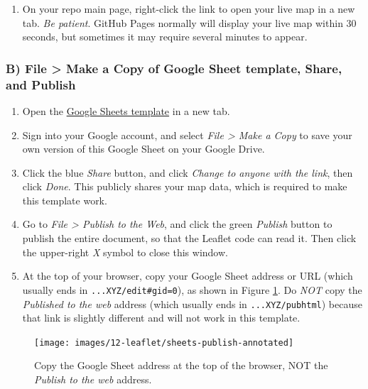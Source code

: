 \documentclass[
  english,
]{book}
\providecommand{\tightlist}{%
  \setlength{\itemsep}{0pt}\setlength{\parskip}{0pt}}
\begin{document}
\begin{enumerate}
\def\labelenumi{\arabic{enumi}.}
\setcounter{enumi}{8}
\tightlist
\item
  On your repo main page, right-click the link to open your live map in a new tab. \emph{Be patient}. GitHub Pages normally will display your live map within 30 seconds, but sometimes it may require several minutes to appear.
\end{enumerate}

\hypertarget{b-file-make-a-copy-of-google-sheet-template-share-and-publish-1}{%
\subsubsection*{B) File \textgreater{} Make a Copy of Google Sheet template, Share, and Publish}\label{b-file-make-a-copy-of-google-sheet-template-share-and-publish-1}}

\begin{enumerate}
\def\labelenumi{\arabic{enumi}.}
\item
  Open the \href{13-}{Google Sheets template} in a new tab.
\item
  Sign into your Google account, and select \emph{File \textgreater{} Make a Copy} to save your own version of this Google Sheet on your Google Drive.
\item
  Click the blue \emph{Share} button, and click \emph{Change to anyone with the link}, then click \emph{Done}. This publicly shares your map data, which is required to make this template work.
\item
  Go to \emph{File \textgreater{} Publish to the Web}, and click the green \emph{Publish} button to publish the entire document, so that the Leaflet code can read it. Then click the upper-right \emph{X} symbol to close this window.
\item
  At the top of your browser, copy your Google Sheet address or URL (which usually ends in \texttt{...XYZ/edit\#gid=0}), as shown in Figure \ref{fig:sheets-publish2}. Do \emph{NOT} copy the \emph{Published to the web} address (which usually ends in \texttt{...XYZ/pubhtml}) because that link is slightly different and will not work in this template.
\end{enumerate}



\begin{figure}
\texttt{[image: images/12-leaflet/sheets-publish-annotated]} \caption{Copy the Google Sheet address at the top of the browser, NOT the \emph{Publish to the web} address.}\label{fig:sheets-publish2}
\end{figure}
\end{document}

